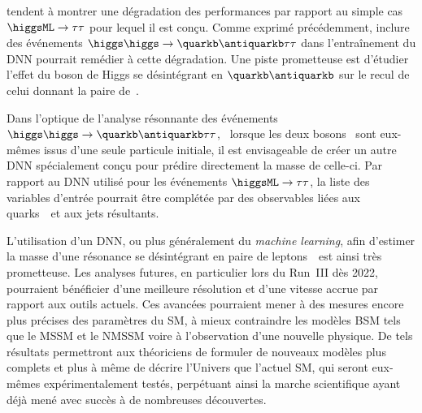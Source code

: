 tendent à montrer une dégradation des performances par rapport au simple cas $\higgsML\to\tau\tau$
pour lequel il est conçu.
Comme exprimé précédemment,
inclure des événements $\higgs\higgs\to\quarkb\antiquarkb\tau\tau$
dans l'entraînement du DNN pourrait remédier à cette dégradation.
Une piste prometteuse est d'étudier l'effet du boson de Higgs se désintégrant en $\quarkb\antiquarkb$ sur le recul de celui donnant la paire de~\tau.
\par
Dans l'optique de l'analyse \og résonnante \fg{} des événements
$\higgs\higgs\to\quarkb\antiquarkb\tau\tau$,
\ie\ lorsque les deux bosons \higgs\ sont eux-mêmes issus d'une seule particule initiale,
il est envisageable de créer un autre DNN
spécialement conçu pour prédire directement la masse de celle-ci.
Par rapport au DNN utilisé pour les événements $\higgsML\to\tau\tau$,
la liste des variables d'entrée pourrait être complétée
par des observables liées aux quarks~\quarkb\ et aux jets résultants.
\par
L'utilisation d'un DNN, ou plus généralement du \emph{machine learning}, afin d'estimer la masse d'une résonance se désintégrant en paire de leptons~\tau\
est ainsi très prometteuse.
Les analyses futures, en particulier lors du Run~III dès 2022,
pourraient bénéficier d'une meilleure résolution et d'une vitesse accrue par rapport aux outils actuels.
Ces avancées pourraient mener
à des mesures encore plus précises des paramètres du SM,
à mieux contraindre les modèles BSM tels que le MSSM et le NMSSM
voire
à l'observation d'une nouvelle physique.
De tels résultats permettront aux théoriciens de formuler de nouveaux modèles
plus complets
et plus à même de décrire l'Univers
que l'actuel SM,
qui seront eux-mêmes expérimentalement testés,
perpétuant ainsi la marche scientifique
ayant déjà mené avec succès à de nombreuses découvertes.